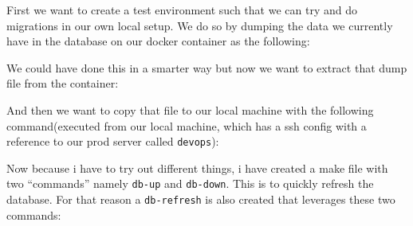 First we want to create a test environment such that we can try and do migrations in our own local setup. We do so by dumping the data we currently have in the database on our docker container as the following:

\begin{Shaded}
\begin{Highlighting}[]
  
\end{Highlighting}
\end{Shaded}

We could have done this in a smarter way but now we want to extract that dump file from the container:

\begin{Shaded}
\begin{Highlighting}[]
  \OperatorTok{\textgreater{}}
\end{Highlighting}
\end{Shaded}

And then we want to copy that file to our local machine with the following command(executed from our local machine, which has a ssh config with a reference to our prod server called \texttt{devops}):

\begin{Shaded}
\begin{Highlighting}[]
\end{Highlighting}
\end{Shaded}

Now because i have to try out different things, i have created a make file with two ``commands'' namely \texttt{db-up} and \texttt{db-down}. This is to quickly refresh the database. For that reason a \texttt{db-refresh} is also created that leverages these two commands:

\begin{Shaded}
\begin{Highlighting}[]


\end{Highlighting}
\end{Shaded}

